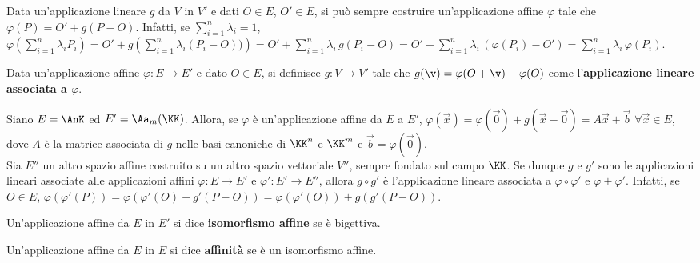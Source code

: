 \documentclass[11pt]{article}
\begin{document}
	\begin{remark}
		Data un'applicazione lineare $g$ da $V$ in $V'$ e dati $O \in E$, $O' \in E$, si può sempre costruire un'applicazione affine $\varphi$ tale che $\varphi(P) = O' + g(P - O)$. Infatti, se $\sum_{i=1}^n \lambda_i = 1$,
		$\varphi\left( \sum_{i=1}^n \lambda_i P_i \right) = O' + g\left( \sum_{i=1}^n \lambda_i (P_i - O) ) \right) =
		O' + \sum_{i=1}^n \lambda_i \, g(P_i - O) = O' + \sum_{i=1}^n \lambda_i \, (\varphi(P_i) - O') = \sum_{i=1}^n \lambda_i \, \varphi(P_i)$.
	\end{remark}
	
	\begin{definition} 
		Data un'applicazione affine $\varphi : E \to E'$ e dato $O \in E$, si definisce $g : V \to V'$ tale che
		$g(\v) = \varphi(O + \v) - \varphi(O)$ come l'\textbf{applicazione lineare associata a $\varphi$}.
	\end{definition}
	
	\begin{remark}\nl
		\li Siano $E = \AnK$ ed $E' = \Aa_m(\KK)$. Allora, se $\varphi$ è un'applicazione affine da $E$ a $E'$,
		$\varphi(\vec x) = \varphi(\vec 0) + g(\vec x - \vec 0) = A \vec x + \vec b$ $\forall \vec x \in E$, dove $A$ è la matrice associata
		di $g$ nelle basi canoniche di $\KK^n$ e $\KK^m$ e $\vec b = \varphi(\vec 0)$. \\

		\li Sia $E''$ un altro spazio affine costruito su un altro spazio
		vettoriale $V''$, sempre fondato sul campo $\KK$. Se dunque $g$ e $g'$ sono le applicazioni lineari associate alle applicazioni affini $\varphi : E \to E'$ e $\varphi' : E' \to E''$,
		allora $g \circ g'$ è l'applicazione lineare associata a $\varphi \circ \varphi'$ e
		$\varphi + \varphi'$. Infatti, se $O \in E$, $\varphi(\varphi'(P)) = \varphi(\varphi'(O) + g'(P-O)) =
		\varphi(\varphi'(O)) + g(g'(P-O))$.
	\end{remark}
	
	\begin{definition}  Un'applicazione affine da $E$ in $E'$ si dice \textbf{isomorfismo affine} se è bigettiva.
	\end{definition}
	
	\begin{definition} [affinità] Un'applicazione affine da $E$ in $E$ si dice \textbf{affinità} se è un isomorfismo affine.
	\end{definition}
	
\end{document}
